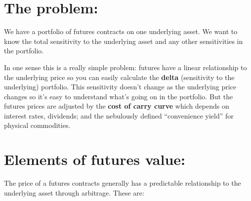\documentclass{tran-l}
\theoremstyle{definition}
\theoremstyle{remark}
\numberwithin{equation}{subsection}
\begin{document}
\section{The problem:}

We have a portfolio of futures contracts on one underlying asset. We want to know the total sensitivity to the underlying asset and any other sensitivities in the portfolio. 

In one sense this is a really simple problem: futures have a linear relationship to the underlying price so you can easily calculate the \textbf{delta} (sensitivity to the underlying)  portfolio. This sensitivity doesn't change as the underlying price changes so it's easy to understand what's going on in the portfolio. But the futures prices are adjusted by the \textbf{cost of carry curve} which depends on interest rates, dividends; and the nebulously defined ``convenience yield'' for physical commodities. 



\section{Elements of futures value:}

The price of a futures contracts generally has a predictable relationship to the underlying asset through arbitrage. These are:
\end{document}
